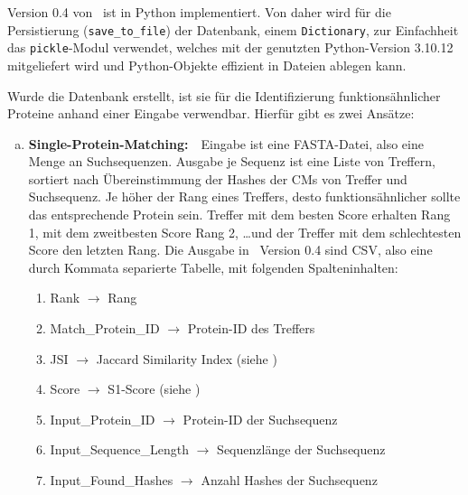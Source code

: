         Version 0.4 von \protfin\ ist in Python implementiert. Von daher wird für die Persistierung (\texttt{save\_to\_file}) der Datenbank, einem \texttt{Dictionary}, zur Einfachheit das \texttt{pickle}-Modul verwendet, welches mit der genutzten Python-Version 3.10.12 mitgeliefert wird und Python-Objekte effizient in Dateien ablegen kann.

        \newpage
        Wurde die Datenbank erstellt, ist sie für die Identifizierung funktionsähnlicher Proteine anhand einer Eingabe verwendbar. Hierfür gibt es zwei Ansätze:
        \begin{enumerate}[a)]
            \item {}
                \textbf{Single-Protein-Matching:}\ \ Eingabe ist eine FASTA-Datei, also eine Menge an Suchsequenzen. Ausgabe je Sequenz ist eine Liste von Treffern, sortiert nach Übereinstimmung der Hashes der \acp{CM} von Treffer und Suchsequenz. Je höher der Rang eines Treffers, desto funktionsähnlicher sollte das entsprechende Protein sein. Treffer mit dem besten Score erhalten Rang 1, mit dem zweitbesten Score Rang 2, \dots und der Treffer mit dem schlechtesten Score den letzten Rang. Die Ausgabe in \protfin\ Version 0.4 sind \ac{CSV}, also eine durch Kommata separierte Tabelle, mit folgenden Spalteninhalten:
                \begin{enumerate}[1.]
                    \item Rank $\rightarrow$ Rang
                    \item Match\_Protein\_ID $\rightarrow$ Protein-ID des Treffers
                    \item JSI $\rightarrow$ Jaccard Similarity Index (siehe )
                    \item Score $\rightarrow$ S1-Score (siehe )
                    \item Input\_Protein\_ID $\rightarrow$ Protein-ID der Suchsequenz
                    \item Input\_Sequence\_Length $\rightarrow$ Sequenzlänge der Suchsequenz
                    \item Input\_Found\_Hashes $\rightarrow$ Anzahl Hashes der Suchsequenz
                \end{enumerate}


\end{enumerate}
